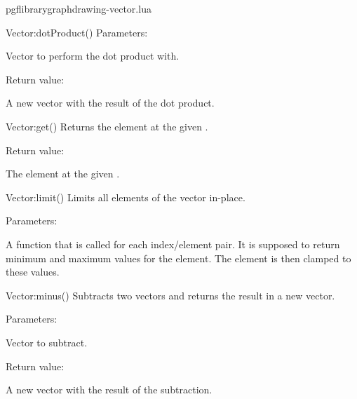 \begin{filedescription}{pgflibrarygraphdrawing-vector.lua}
\begin{luacommand}{{Vector:dotProduct}()}
Parameters:
\begin{parameterdescription}
	\item[\meta{other}] Vector to perform the dot product with. 
\end{parameterdescription}


Return value:
\begin{parameterdescription} 
  \item[] A new vector with the result of the dot product. 
\end{parameterdescription}


\end{luacommand}
\begin{luacommand}{{Vector:get}()}
Returns the element at the given . 


Return value:
\begin{parameterdescription} 
  \item[] The element at the given . 
\end{parameterdescription}


\end{luacommand}
\begin{luacommand}{{Vector:limit}()}
Limits all elements of the vector in-place. 

Parameters:
\begin{parameterdescription}
	\item[\meta{limit\_function}] A function that is called for each index/element pair. It is supposed to return minimum and maximum values for the element. The element is then clamped to these values. 
\end{parameterdescription}



\end{luacommand}
\begin{luacommand}{{Vector:minus}()}
Subtracts two vectors and returns the result in a new vector. 

Parameters:
\begin{parameterdescription}
	\item[\meta{other}] Vector to subtract. 
\end{parameterdescription}


Return value:
\begin{parameterdescription} 
  \item[] A new vector with the result of the subtraction. 
\end{parameterdescription}



\end{luacommand}
\end{filedescription}
